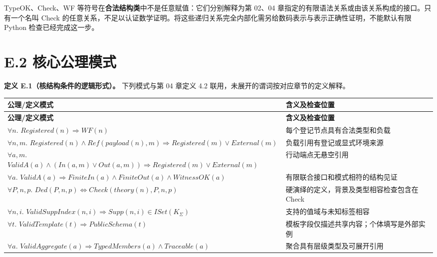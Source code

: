 \documentclass[UTF8,a4paper,zihao=-4,fontset=windows,openany]{ctexbook}
\def\mathrm#1{#1}%
\begin{document}
TypeOK、Check、WF 等符号在\textbf{合法结构类}中不是任意赋值：它们分别解释为第 02、04 章指定的有限语法关系或由该关系构成的接口。只有一个名叫 Check 的任意关系，不足以认证数学证明。将这些递归关系完全内部化需另给数码表示与表示正确性证明，不能默认有限 Python 检查已经完成这一步。

\section{E.2 核心公理模式}
\textbf{定义 E.1（核结构条件的逻辑形式）。} 下列模式与第 04 章定义 4.2 联用，未展开的谓词按对应章节的定义解释。

\begingroup\small\setlength{\tabcolsep}{4pt}
\begin{longtable}{>{\raggedright\arraybackslash}p{}>{\raggedright\arraybackslash}p{}}
\toprule
\textbf{公理/定义模式} & \textbf{含义及检查位置} \\
\midrule
\endfirsthead
\toprule
\textbf{公理/定义模式} & \textbf{含义及检查位置} \\
\midrule
\endhead
\bottomrule
\endfoot
\bottomrule
\endlastfoot
\(\forall n.\) \(\mathrm{Registered}(n)\Rightarrow\mathrm{WF}(n)\) & 每个登记节点具有合法类型和负载 \\
\(\forall n,m.\) \(\mathrm{Registered}(n)\land\mathrm{Ref}(\mathrm{payload}(n),m)\Rightarrow\mathrm{Registered}(m)\lor\mathrm{External}(m)\) & 负载引用有登记或显式环境来源 \\
\(\forall a,m.\) \(\mathrm{ValidA}(a)\land(\mathrm{In}(a,m)\lor\mathrm{Out}(a,m))\Rightarrow\mathrm{Registered}(m)\lor\mathrm{External}(m)\) & 行动端点无悬空引用 \\
\(\forall a.\) \(\mathrm{ValidA}(a)\Rightarrow\mathrm{FiniteIn}(a)\land\mathrm{FiniteOut}(a)\land\mathrm{WitnessOK}(a)\) & 有限联合接口和模式相符的结构见证 \\
\(\forall P,n,p.\) \(\mathrm{Ded}(P,n,p)\Leftrightarrow\mathrm{Check}(\mathrm{theory}(n),P,n,p)\) & 硬演绎的定义，背景及类型相容检查包含在 Check \\
\(\forall n,i.\) \(\mathrm{ValidSuppIndex}(n,i)\Rightarrow\mathrm{Supp}(n,i)\in\mathrm{ISet}(K_\Sigma)\) & 支持的值域与未知标签相容 \\
\(\forall t.\) \(\mathrm{ValidTemplate}(t)\Rightarrow\mathrm{PublicSchema}(t)\) & 模板字段仅描述共享内容；个体填写是外部实例 \\
\(\forall a.\) \(\mathrm{ValidAggregate}(a)\Rightarrow\mathrm{TypedMembers}(a)\land\mathrm{Traceable}(a)\) & 聚合具有层级类型及可展开引用 \\
\end{longtable}
\endgroup
\end{document}
